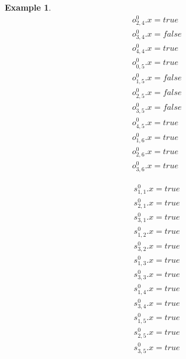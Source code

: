 \documentclass{report}
\theoremstyle{plain}
\newtheorem{example}{Example}[section]
\begin{document}
\begin{example}
\begin{minipage}[t]{0.15\textwidth}
\begin{align*}
& o_{2,4}^0.x=true \\
& o_{3,4}^0.x=false \\
& o_{4,4}^0.x=true \\
& o_{0,5}^0.x=true \\
& o_{1,5}^0.x=false \\
& o_{2,5}^0.x=false \\
& o_{3,5}^0.x=false \\
& o_{4,5}^0.x=true \\
& o_{1,6}^0.x=true \\
& o_{2,6}^0.x=true \\
& o_{3,6}^0.x=true
\end{align*}
\end{minipage}
\begin{minipage}[t]{0.15\textwidth}
\begin{align*}
& s_{1,1}^0.x=true \\
& s_{2,1}^0.x=true \\
& s_{3,1}^0.x=true \\
& s_{1,2}^0.x=true \\
& s_{3,2}^0.x=true \\
& s_{1,3}^0.x=true \\
& s_{3,3}^0.x=true \\
& s_{1,4}^0.x=true \\
& s_{3,4}^0.x=true \\
& s_{1,5}^0.x=true \\
& s_{2,5}^0.x=true \\
& s_{3,5}^0.x=true
\end{align*}
\end{minipage}

\end{example}
\end{document}
